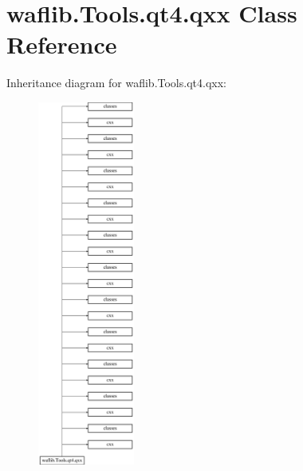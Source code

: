 \hypertarget{classwaflib_1_1_tools_1_1qt4_1_1qxx}{}\section{waflib.\+Tools.\+qt4.\+qxx Class Reference}
\label{classwaflib_1_1_tools_1_1qt4_1_1qxx}
Inheritance diagram for waflib.\+Tools.\+qt4.\+qxx\+:\begin{figure}[H]
\begin{center}
\leavevmode
\includegraphics[height=12.000000cm]{classwaflib_1_1_tools_1_1qt4_1_1qxx}
\end{center}
\end{figure}
